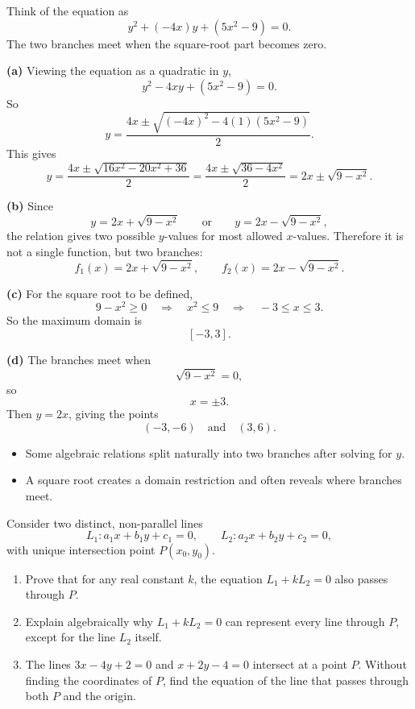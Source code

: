 \begin{hint}
Think of the equation as
\[
y^2+(-4x)y+(5x^2-9)=0.
\]
The two branches meet when the square-root part becomes zero.
\end{hint}

\begin{solution}
\textbf{(a)} Viewing the equation as a quadratic in $y$,
\[
y^2-4xy+(5x^2-9)=0.
\]
So
\[
y=\frac{4x\pm\sqrt{(-4x)^2-4(1)(5x^2-9)}}{2}.
\]
This gives
\[
y=\frac{4x\pm\sqrt{16x^2-20x^2+36}}{2}
=\frac{4x\pm\sqrt{36-4x^2}}{2}
=2x\pm\sqrt{9-x^2}.
\]

\textbf{(b)} Since
\[
y=2x+\sqrt{9-x^2}
\qquad \text{or} \qquad
y=2x-\sqrt{9-x^2},
\]
the relation gives two possible $y$-values for most allowed $x$-values. Therefore it is not a single function, but two branches:
\[
f_1(x)=2x+\sqrt{9-x^2},
\qquad
f_2(x)=2x-\sqrt{9-x^2}.
\]

\textbf{(c)} For the square root to be defined,
\[
9-x^2\ge 0
\quad\Longrightarrow\quad
x^2\le 9
\quad\Longrightarrow\quad
-3\le x\le 3.
\]
So the maximum domain is
\[
\boxed{[-3,3].}
\]

\textbf{(d)} The branches meet when
\[
\sqrt{9-x^2}=0,
\]
so
\[
x=\pm 3.
\]
Then $y=2x$, giving the points
\[
\boxed{(-3,-6)\quad \text{and}\quad (3,6).}
\]
\end{solution}

\begin{takeaways}
\begin{itemize}[leftmargin=*]
\item Some algebraic relations split naturally into two branches after solving for $y$.
\item A square root creates a domain restriction and often reveals where branches meet.
\end{itemize}
\end{takeaways}

\begin{problem}
Consider two distinct, non-parallel lines
\[
L_1: a_1x+b_1y+c_1=0,
\qquad
L_2: a_2x+b_2y+c_2=0,
\]
with unique intersection point $P(x_0,y_0)$.
\begin{enumerate}[label=(\alph*)]
\item Prove that for any real constant $k$, the equation $L_1+kL_2=0$ also passes through $P$.
\item Explain algebraically why $L_1+kL_2=0$ can represent every line through $P$, except for the line $L_2$ itself.
\item The lines $3x-4y+2=0$ and $x+2y-4=0$ intersect at a point $P$. Without finding the coordinates of $P$, find the equation of the line that passes through both $P$ and the origin.
\end{enumerate}
\end{problem}

